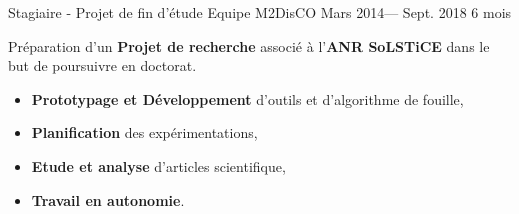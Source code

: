 \jobposition%
{Stagiaire - Projet de fin d'étude}%
{Equipe M2DisCO}
{Mars 2014--- Sept. 2018}%
{6 mois}%
{
	Préparation d'un \textbf{Projet de recherche} associé à l'\textbf{ANR SoLSTiCE}
	dans le but de poursuivre en doctorat.

	\begin{itemize}
		\item \textbf{Prototypage et Développement} d’outils et d’algorithme de fouille,
		\item \textbf{Planification} des expérimentations,
		\item \textbf{Etude et analyse} d'articles scientifique,
		\item \textbf{Travail en autonomie}.
	\end{itemize}

}
